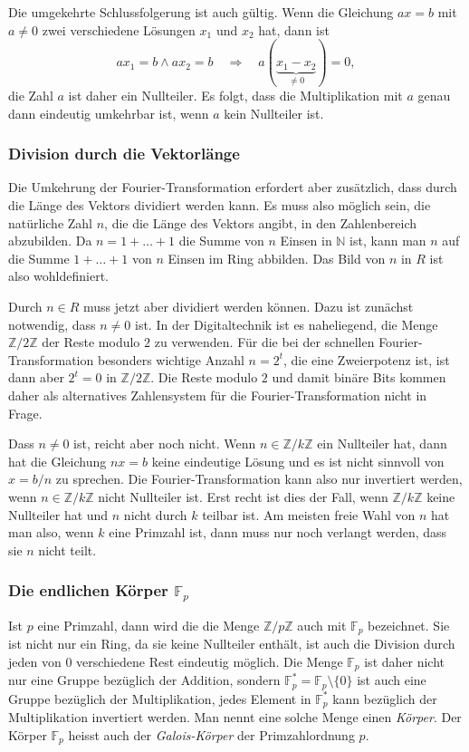 Die umgekehrte Schlussfolgerung ist auch gültig.
Wenn die Gleichung $ax=b$ mit $a\ne 0$ zwei verschiedene Lösungen
$x_1$ und $x_2$ hat, dann ist
\[
ax_1=b
\wedge
ax_2=b
\quad\Rightarrow\quad
a(\underbrace{x_1-x_2}_{\displaystyle\ne 0})=0,
\]
die Zahl $a$ ist daher ein Nullteiler.
Es folgt, dass die Multiplikation mit $a$ genau dann eindeutig umkehrbar
ist, wenn $a$ kein Nullteiler ist.

%
%
\subsubsection{Division durch die Vektorlänge}
Die Umkehrung der Fourier-Transformation erfordert aber zusätzlich,
dass durch die Länge des Vektors dividiert werden kann.
Es muss also möglich sein, die natürliche Zahl $n$, die die Länge
des Vektors angibt, in den Zahlenbereich abzubilden.
Da $n = 1+\dots + 1$ die Summe von $n$ Einsen in $\mathbb{N}$ ist,
kann man $n$ auf die Summe $1+\dots+1$ von $n$ Einsen im Ring abbilden.
Das Bild von $n$ in $R$ ist also wohldefiniert.

Durch $n \in R$ muss jetzt aber dividiert werden können.
Dazu ist zunächst notwendig, dass $n\ne 0$ ist.
In der Digitaltechnik ist es naheliegend, die Menge $\mathbb{Z}/2\mathbb{Z}$
der Reste modulo $2$ zu verwenden.
Für die bei der schnellen Fourier-Transformation besonders wichtige
Anzahl $n=2^t$, die eine Zweierpotenz ist, ist dann aber $2^t=0$ in
$\mathbb{Z}/2\mathbb{Z}$.
Die Reste modulo $2$ und damit binäre Bits kommen daher als alternatives
Zahlensystem für die Fourier-Transformation nicht in Frage.

Dass $n\ne 0$ ist, reicht aber noch nicht.
Wenn $n\in \mathbb{Z}/k\mathbb{Z}$ ein Nullteiler hat, dann hat die
Gleichung $nx=b$ keine eindeutige Lösung und es ist nicht sinnvoll
von $x = b/n$ zu sprechen.
Die Fourier-Transformation kann also nur invertiert werden, wenn
$n\in \mathbb{Z}/k\mathbb{Z}$ nicht Nullteiler ist.
Erst recht ist dies der Fall, wenn $\mathbb{Z}/k\mathbb{Z}$ keine
Nullteiler hat und $n$ nicht durch $k$ teilbar ist.
Am meisten freie Wahl von $n$ hat man also, wenn $k$ eine Primzahl
ist, dann muss nur noch verlangt werden, dass sie $n$ nicht teilt.

%
%
\subsubsection{Die endlichen Körper $\mathbb{F}_p$}
Ist $p$ eine Primzahl, dann wird die
die Menge $\mathbb{Z}/p\mathbb{Z}$ auch mit $\mathbb{F}_p$
bezeichnet.
Sie ist nicht nur ein Ring, da sie keine Nullteiler enthält, ist auch
die Division durch jeden von $0$ verschiedene Rest eindeutig möglich.
Die Menge $\mathbb{F}_p$ ist daher nicht nur eine Gruppe bezüglich
der Addition, sondern $\mathbb{F}_p^*=\mathbb{F}_p\setminus\{0\}$
ist auch eine Gruppe bezüglich der Multiplikation, jedes Element 
in $\mathbb{F}_p^*$ kann bezüglich der Multiplikation invertiert
werden.
Man nennt eine solche Menge einen {\em Körper}.
Der Körper $\mathbb{F}_p$ heisst auch der {\em Galois-Körper} 
der Primzahlordnung $p$.
%

